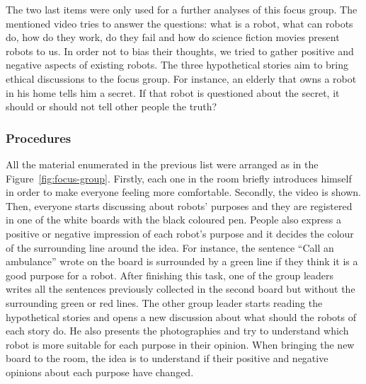 The two last items were only used for a further analyses of this focus group.
The mentioned video tries to answer the questions: what is a robot, what can robots do, how do they work, do they fail and how do science fiction movies present robots to us.
In order not to bias their thoughts, we tried to gather positive and negative aspects of existing robots.
The three hypothetical stories aim to bring ethical discussions to the focus group.
For instance, an elderly that owns a robot in his home tells him a secret.
If that robot is questioned about the secret, it should or should not tell other people the truth?

\subsubsection{Procedures}
All the material enumerated in the previous list were arranged as in the Figure~\ref{fig:focus-group}.
Firstly, each one in the room briefly introduces himself in order to make everyone feeling more comfortable.
Secondly, the video is shown.
Then, everyone starts discussing about robots' purposes and they are registered in one of the white boards with the black coloured pen.
People also express a positive or negative impression of each robot's purpose and it decides the colour of the surrounding line around the idea.
For instance, the sentence ``Call an ambulance'' wrote on the board is surrounded by a green line if they think it is a good purpose for a robot.
After finishing this task, one of the group leaders writes all the sentences previously collected in the second board but without the surrounding green or red lines.
The other group leader starts reading the hypothetical stories and opens a new discussion about what should the robots of each story do.
He also presents the photographies and try to understand which robot is more suitable for each purpose in their opinion.
When bringing the new board to the room, the idea is to understand if their positive and negative opinions about each purpose have changed.

